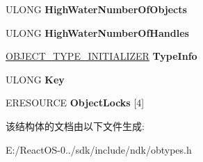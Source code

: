 \begin{DoxyCompactItemize}
U\+L\+O\+NG {\bfseries High\+Water\+Number\+Of\+Objects}
\item 
\mbox{\label{struct___o_b_j_e_c_t___t_y_p_e_abad5aaf8c18506be185d36c80c16bbc2}} 
U\+L\+O\+NG {\bfseries High\+Water\+Number\+Of\+Handles}
\item 
\mbox{\label{struct___o_b_j_e_c_t___t_y_p_e_a819c0d062b6ab22a4af585a6e7814f05}} 
\hyperlink{struct___o_b_j_e_c_t___t_y_p_e___i_n_i_t_i_a_l_i_z_e_r}{O\+B\+J\+E\+C\+T\+\_\+\+T\+Y\+P\+E\+\_\+\+I\+N\+I\+T\+I\+A\+L\+I\+Z\+ER} {\bfseries Type\+Info}
\item 
\mbox{\label{struct___o_b_j_e_c_t___t_y_p_e_a93c242be8c2609751f4c900815b86a8f}} 
U\+L\+O\+NG {\bfseries Key}
\item 
\mbox{\label{struct___o_b_j_e_c_t___t_y_p_e_a8661307a3e4cefe0c5c0f04dde6279bc}} 
E\+R\+E\+S\+O\+U\+R\+CE {\bfseries Object\+Locks} \mbox{[}4\mbox{]}
\end{DoxyCompactItemize}


该结构体的文档由以下文件生成\+:\begin{DoxyCompactItemize}
\item 
E\+:/\+React\+O\+S-\/0../sdk/include/ndk/obtypes.\+h\end{DoxyCompactItemize}
